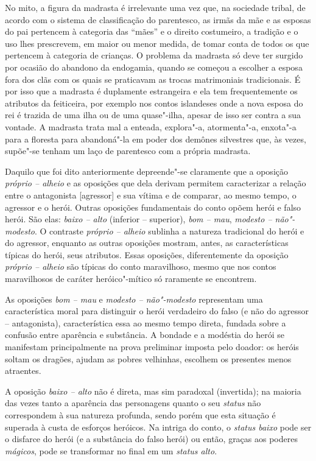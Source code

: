{No mito, a figura da madrasta é irrelevante uma vez que, na sociedade
tribal, de acordo com o sistema de classificação do parentesco, as irmãs
da mãe e as esposas do pai pertencem à categoria das ``mães'' e o
direito costumeiro, a tradição e o uso lhes prescrevem, em maior ou
menor medida, de tomar conta de todos os que pertencem à categoria de
crianças. O problema da madrasta só deve ter surgido por ocasião do
abandono da endogamia, quando se começou a escolher a esposa fora dos
clãs com os quais se praticavam as trocas matrimoniais tradicionais. É
por isso que a madrasta é duplamente estrangeira e ela tem
frequentemente os atributos da feiticeira, por exemplo nos contos
islandeses onde a nova esposa do rei é trazida de uma ilha ou de uma
quase"-ilha, apesar de isso ser contra a sua vontade. A madrasta trata
mal a enteada, explora"-a, atormenta"-a, enxota"-a para a floresta para
abandoná"-la em poder dos demônes silvestres que, às vezes, supõe"-se
tenham um laço de parentesco com a própria madrasta.

Daquilo que foi dito anteriormente depreende"-se claramente que a
oposição \emph{próprio -- alheio} e as oposições que dela derivam permitem
caracterizar a relação entre o antagonista [agressor] e sua vítima e
de comparar, ao mesmo tempo, o agressor e o herói. Outras oposições
fundamentais do conto opõem herói e falso herói. São elas: \emph{baixo --
alto} (inferior -- superior), \emph{bom -- mau}, \emph{modesto -- não"-modesto}. O
contraste \emph{próprio -- alheio} sublinha a natureza tradicional do herói e
do agressor, enquanto as outras oposições mostram, antes, as
características típicas do herói, seus atributos. Essas oposições,
diferentemente da oposição \emph{próprio -- alheio} são típicas do conto
maravilhoso, mesmo que nos contos maravilhosos de caráter heróico"-mítico
só raramente se encontrem.

As oposições \emph{bom -- mau} e \emph{modesto -- não"-modesto} representam uma
característica moral para distinguir o herói verdadeiro do falso (e não
do agressor -- antagonista), característica essa ao mesmo tempo direta,
fundada sobre a confusão entre aparência e substância. A bondade e a
modéstia do herói se manifestam principalmente na prova preliminar
imposta pelo doador: os heróis soltam os dragões, ajudam as pobres
velhinhas, escolhem os presentes menos atraentes.

A oposição \emph{baixo -- alto} não é direta, mas sim paradoxal (invertida);
na maioria das vezes tanto a aparência das personagens quanto o
seu \emph{status} não correspondem à sua natureza profunda, sendo porém que
esta situação é superada à custa de esforços heróicos. Na intriga do
conto, o \emph{status baixo} pode ser o disfarce do herói (e a substância
do falso herói) ou então, graças aos poderes \emph{mágicos}, pode se
transformar no final em um \emph{status alto}.

}
